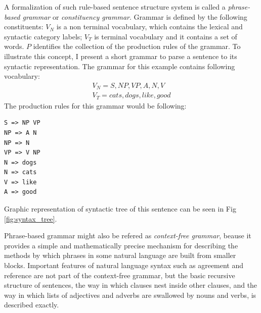 A formalization of such rule-based sentence structure system is called a \emph{phrase-based grammar} or \emph{constituency grammar}. Grammar is defined by the following constituents:
$V_N$ is a non terminal vocabulary, which contains the lexical and syntactic category labels;
$V_T$ is terminal vocabulary and it contains a set of words.
$P$ identifies the collection of the production rules of the grammar.
To illustrate this concept, I present a short grammar to parse a sentence  to its syntactic representation. The grammar for this example contains following vocabulary:
\begin{equation}
\begin{split}
V_N = {S, NP, VP, A, N, V}\\
V_T = {cats, dogs, like, good}
\end{split}
\end{equation}
The production rules for this grammar would be following:
\begin{verbatim}
S => NP VP
NP => A N
NP => N
VP => V NP
N => dogs
N => cats
V => like
A => good
\end{verbatim}
Graphic representation of syntactic tree  of this sentence can be seen in Fig \ref{fig:syntax_tree}.

Phrase-based grammar might also be refered as \emph{context-free grammar}, beause it provides a simple and mathematically precise mechanism for describing the methods by which phrases in some natural language are built from smaller blocks. Important features of natural language syntax such as agreement and reference are not part of the context-free grammar, but the basic recursive structure of sentences, the way in which clauses nest inside other clauses, and the way in which lists of adjectives and adverbs are swallowed by nouns and verbs, is described exactly.

